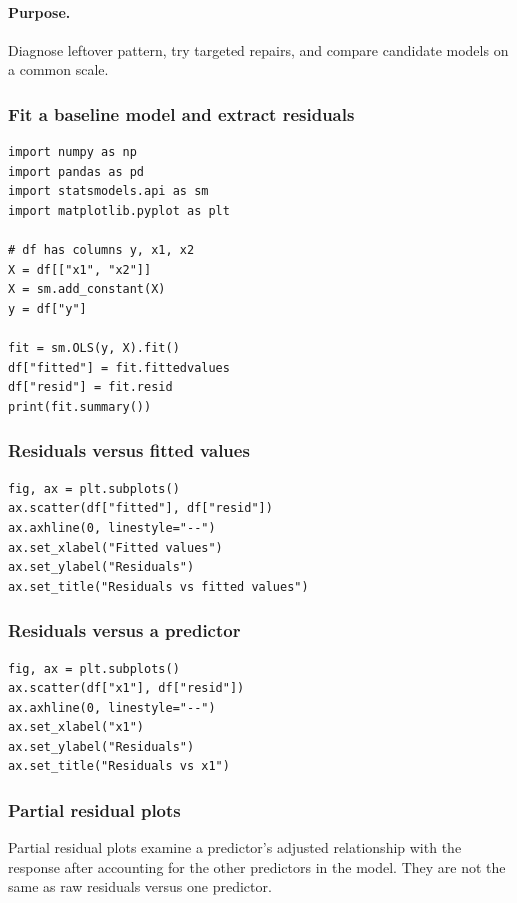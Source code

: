 \paragraph{Purpose.} Diagnose leftover pattern, try targeted repairs, and compare candidate models on a common scale.

\subsubsection*{Fit a baseline model and extract residuals}

\begin{verbatim}
import numpy as np
import pandas as pd
import statsmodels.api as sm
import matplotlib.pyplot as plt

# df has columns y, x1, x2
X = df[["x1", "x2"]]
X = sm.add_constant(X)
y = df["y"]

fit = sm.OLS(y, X).fit()
df["fitted"] = fit.fittedvalues
df["resid"] = fit.resid
print(fit.summary())
\end{verbatim}

\subsubsection*{Residuals versus fitted values}

\begin{verbatim}
fig, ax = plt.subplots()
ax.scatter(df["fitted"], df["resid"])
ax.axhline(0, linestyle="--")
ax.set_xlabel("Fitted values")
ax.set_ylabel("Residuals")
ax.set_title("Residuals vs fitted values")
\end{verbatim}

\subsubsection*{Residuals versus a predictor}

\begin{verbatim}
fig, ax = plt.subplots()
ax.scatter(df["x1"], df["resid"])
ax.axhline(0, linestyle="--")
ax.set_xlabel("x1")
ax.set_ylabel("Residuals")
ax.set_title("Residuals vs x1")
\end{verbatim}

\subsubsection*{Partial residual plots}

Partial residual plots examine a predictor's adjusted relationship with the response after accounting for the other predictors in the model.  They are not the same as raw residuals versus one predictor.

